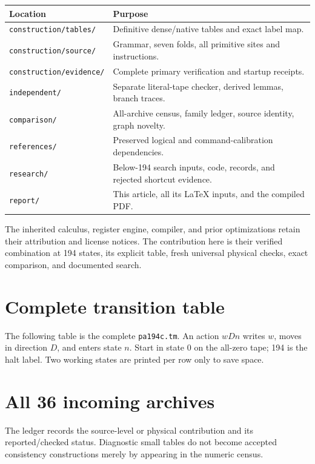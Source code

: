 \documentclass[11pt,letterpaper]{article}
\newcommand{\file}[1]{\texttt{\nolinkurl{#1}}}
\begin{document}
\begin{center}\small
\begin{tabularx}{\linewidth}{@{}lX@{}}
\toprule
Location & Purpose\\
\midrule
\file{construction/tables/} & Definitive dense/native tables and exact label map.\\
\file{construction/source/} & Grammar, seven folds, all primitive sites and instructions.\\
\file{construction/evidence/} & Complete primary verification and startup receipts.\\
\file{independent/} & Separate literal-tape checker, derived lemmas, branch traces.\\
\file{comparison/} & All-archive census, family ledger, source identity, graph novelty.\\
\file{references/} & Preserved logical and command-calibration dependencies.\\
\file{research/} & Below-194 search inputs, code, records, and rejected shortcut evidence.\\
\file{report/} & This article, all its LaTeX inputs, and the compiled PDF.\\
\bottomrule
\end{tabularx}
\end{center}

The inherited calculus, register engine, compiler, and prior optimizations
retain their attribution and license notices. The contribution here is
their verified combination at 194 states, its explicit table, fresh
universal physical checks, exact comparison, and documented search.

\appendix
\clearpage
\section{Complete transition table}
\label{app:table}
The following table is the complete \file{pa194c.tm}. An action $wDn$
writes $w$, moves in direction $D$, and enters state $n$. Start in state
0 on the all-zero tape; 194 is the halt label. Two working states are
printed per row only to save space.


\clearpage
\section{All 36 incoming archives}
\label{app:ledger}
The ledger records the source-level or physical contribution and its
reported/checked status. Diagnostic small tables do not become accepted
consistency constructions merely by appearing in the numeric census.

\end{document}
